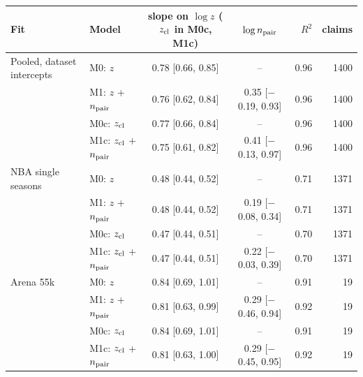 \begin{tabular}{llccrr}
\toprule
Fit & Model & slope on $\log z$ ($z_{\rm cl}$ in M0c, M1c) & $\log n_{\rm pair}$ & $R^2$ & claims \\
\midrule
Pooled, dataset intercepts & M0: $z$ & 0.78 [0.66, 0.85] & -- & 0.96 & 1400 \\
 & M1: $z$ + $n_{\rm pair}$ & 0.76 [0.62, 0.84] & 0.35 [$-$0.19, 0.93] & 0.96 & 1400 \\
 & M0c: $z_{\rm cl}$ & 0.77 [0.66, 0.84] & -- & 0.96 & 1400 \\
 & M1c: $z_{\rm cl}$ + $n_{\rm pair}$ & 0.75 [0.61, 0.82] & 0.41 [$-$0.13, 0.97] & 0.96 & 1400 \\
\midrule
NBA single seasons & M0: $z$ & 0.48 [0.44, 0.52] & -- & 0.71 & 1371 \\
 & M1: $z$ + $n_{\rm pair}$ & 0.48 [0.44, 0.52] & 0.19 [$-$0.08, 0.34] & 0.71 & 1371 \\
 & M0c: $z_{\rm cl}$ & 0.47 [0.44, 0.51] & -- & 0.70 & 1371 \\
 & M1c: $z_{\rm cl}$ + $n_{\rm pair}$ & 0.47 [0.44, 0.51] & 0.22 [$-$0.03, 0.39] & 0.70 & 1371 \\
\midrule
Arena 55k & M0: $z$ & 0.84 [0.69, 1.01] & -- & 0.91 & 19 \\
 & M1: $z$ + $n_{\rm pair}$ & 0.81 [0.63, 0.99] & 0.29 [$-$0.46, 0.94] & 0.92 & 19 \\
 & M0c: $z_{\rm cl}$ & 0.84 [0.69, 1.01] & -- & 0.91 & 19 \\
 & M1c: $z_{\rm cl}$ + $n_{\rm pair}$ & 0.81 [0.63, 1.00] & 0.29 [$-$0.45, 0.95] & 0.92 & 19 \\
\bottomrule
\end{tabular}
